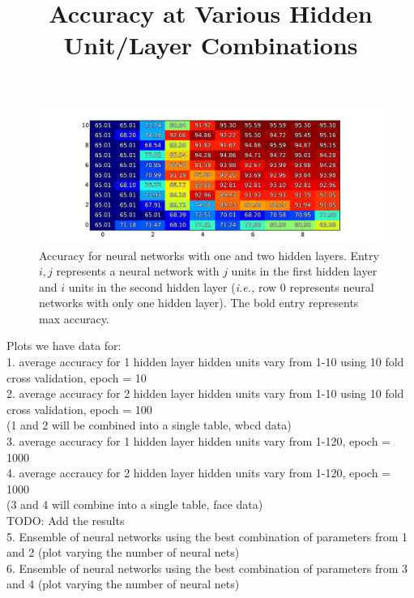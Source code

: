 \begin{figure}[t]
  \title{Accuracy at Various Hidden Unit/Layer Combinations}
\centering
\includegraphics[width=\textwidth]{figs/wbcd_table}
\caption {Accuracy for neural networks with one and two hidden layers. Entry \(i,j\) represents a neural network with \(j\) units in the first hidden layer and \(i\) units in the second hidden layer ({\em i.e.,} row 0 represents neural networks with only one hidden layer). The bold entry represents max accuracy.}

\label{fig:wbcd_table}

\end{figure}


Plots we have data for:\\
1. average accuracy for 1 hidden layer hidden units vary from 1-10 using 10 fold cross validation, epoch = 10\\
2. average accuracy for 2 hidden layer hidden units vary from 1-10 using 10 fold cross validation, epoch = 100\\
(1 and 2 will be combined into a single table, wbcd data)\\
3. average accuracy for 1 hidden layer hidden units vary from 1-120, epoch = 1000\\
4. average accraucy for 2 hidden layer hidden units vary from 1-120, epoch = 1000\\
(3 and 4 will combine into a single table, face data)\\

TODO: Add the results\\
5. Ensemble of neural networks using the best combination of parameters from 1 and 2 (plot varying the number of neural nets)\\
6. Ensemble of neural networks using the best combination of parameters from 3 and 4 (plot varying the number of neural nets)\\
 

